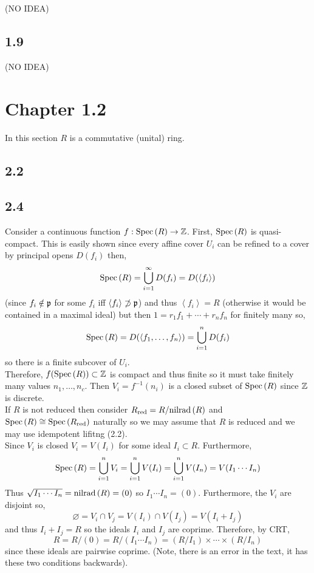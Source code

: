 \documentclass[12pt]{article}
\begin{document}
(NO IDEA)

\subsection{1.9}

(NO IDEA)

\section{Chapter 1.2}

\begin{remark}
In this section $R$ is a commutative (unital) ring. 
\end{remark}

\subsection{2.2}

\subsection{2.4}

Consider a continuous function $f : \mathrm{Spec}\left( R \right) \to \mathbb{Z}$. First, $\mathrm{Spec}\left( R \right)$ is quasi-compact. This is easily shown since every affine cover $U_i$ can be refined to a cover by principal opens $D(f_i)$ then,
\[ \mathrm{Spec}\left( R \right) = \bigcup_{i = 1}^\infty D(f_i) = D( \left< f_i \right> ) \]
(since $f_i \notin \mathfrak{p}$ for some $f_i$ iff $\left< f_i \right> \not\supset \mathfrak{p}$) and thus $\left< f_i \right> = R$ (otherwise it would be contained in a maximal ideal) but then $1 = r_1 f_1 + \cdots + r_n f_n$ for finitely many so,
\[ \mathrm{Spec}\left( R \right) = D(\left< f_1, \dots, f_n \right>) = \bigcup_{ i = 1}^n D(f_i) \]
so there is a finite subcover of $U_i$. 
\bigskip\\
Therefore, $f(\mathrm{Spec}\left( R \right)) \subset \mathbb{Z}$ is compact and thus finite so it must take finitely many values $n_1, \dots, n_c$. Then $V_i = f^{-1}(n_i)$ is a closed subset of $\mathrm{Spec}\left( R \right)$ since $\mathbb{Z}$ is discrete. 
\bigskip\\
If $R$ is not reduced then consider $R_{\mathrm{red}} = R / \mathrm{nilrad}\left( R \right)$ and $\mathrm{Spec}\left( R \right) \cong \mathrm{Spec}\left( R_{\mathrm{red}} \right)$ naturally so we may assume that $R$ is reduced and we may use idempotent lifitng (2.2). 
\bigskip\\
Since $V_i$ is closed $V_i = V(I_i)$ for some ideal $I_i \subset R$. Furthermore,
\[ \mathrm{Spec}\left( R \right) = \bigcup_{i = 1}^n V_i = \bigcup_{i = 1}^n V(I_i) = \bigcup_{i = 1}^n V(I_n) = V(I_1 \cdots I_n) \]
Thus $\sqrt{I_1 \cdots I_n} = \mathrm{nilrad}\left( R \right) = (0)$ so $I_1 \cdots I_n = (0)$. Furthermore, the $V_i$ are disjoint so,
\[ \varnothing = V_i \cap V_j = V(I_i) \cap V(I_j) = V(I_i + I_j) \]
and thus $I_i + I_j = R$ so the ideals $I_i$ and $I_j$ are coprime. Therefore, by CRT,
\[ R = R/(0) = R / (I_1 \cdots I_n) = (R / I_1) \times \cdots \times (R / I_n) \]
since these ideals are pairwise coprime. (Note, there is an error in the text, it has these two conditions backwards). 
\end{document}
